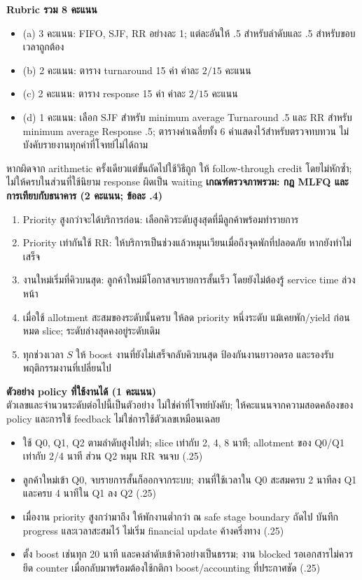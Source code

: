 \noindent\textbf{Rubric รวม 8 คะแนน}
\begin{itemize}[leftmargin=1.4em,itemsep=.12cm]
\item (a) 3 คะแนน: FIFO, SJF, RR อย่างละ 1; แต่ละอันให้ .5 สำหรับลำดับและ .5 สำหรับขอบเวลาถูกต้อง
\item (b) 2 คะแนน: ตาราง turnaround 15 ค่า ค่าละ $2/15$ คะแนน
\item (c) 2 คะแนน: ตาราง response 15 ค่า ค่าละ $2/15$ คะแนน
\item (d) 1 คะแนน: เลือก SJF สำหรับ minimum average Turnaround .5 และ RR สำหรับ minimum average Response .5; ตารางค่าเฉลี่ยทั้ง 6 ค่าแสดงไว้สำหรับตรวจทบทวน ไม่บังคับรายงานทุกค่าที่โจทย์ไม่ได้ถาม
\end{itemize}
\noindent หากผิดจาก arithmetic ครั้งเดียวแต่ขั้นถัดไปใช้วิธีถูก ให้ follow-through credit โดยไม่หักซ้ำ; ไม่ให้ครบในส่วนที่ใช้นิยาม response ผิดเป็น waiting
\newpage{}
\noindent\textbf{เกณฑ์ตรวจภาพรวม: กฎ MLFQ และการเทียบกับธนาคาร (2 คะแนน; ข้อละ .4)}
\begin{enumerate}[leftmargin=1.4em,itemsep=.18cm]
\item Priority สูงกว่าจะได้บริการก่อน: เลือกคิวระดับสูงสุดที่มีลูกค้าพร้อมทำรายการ
\item Priority เท่ากันใช้ RR: ให้บริการเป็นช่วงแล้วหมุนเวียนเมื่อถึงจุดพักที่ปลอดภัย หากยังทำไม่เสร็จ
\item งานใหม่เริ่มที่คิวบนสุด: ลูกค้าใหม่มีโอกาสจบรายการสั้นเร็ว โดยยังไม่ต้องรู้ service time ล่วงหน้า
\item เมื่อใช้ allotment สะสมของระดับนั้นครบ ให้ลด priority หนึ่งระดับ แม้เคยพัก/yield ก่อนหมด slice; ระดับล่างสุดคงอยู่ระดับเดิม
\item ทุกช่วงเวลา $S$ ให้ boost งานที่ยังไม่เสร็จกลับคิวบนสุด ป้องกันงานยาวอดรอ และรองรับพฤติกรรมงานที่เปลี่ยนไป
\end{enumerate}
\noindent\textbf{ตัวอย่าง policy ที่ใช้งานได้ (1 คะแนน)}\\
ตัวเลขและจำนวนระดับต่อไปนี้เป็นตัวอย่าง ไม่ใช่ค่าที่โจทย์บังคับ; ให้คะแนนจากความสอดคล้องของ policy และการใช้ feedback ไม่ใช่การใช้ตัวเลขเหมือนเฉลย
\begin{itemize}[leftmargin=1.4em,itemsep=.12cm]
\item ใช้ Q0, Q1, Q2 ตามลำดับสูงไปต่ำ; slice เท่ากับ 2, 4, 8 นาที; allotment ของ Q0/Q1 เท่ากับ 2/4 นาที ส่วน Q2 หมุน RR จนจบ (.25)
\item ลูกค้าใหม่เข้า Q0, จบรายการสั้นก็ออกจากระบบ; งานที่ใช้เวลาใน Q0 สะสมครบ 2 นาทีลง Q1 และครบ 4 นาทีใน Q1 ลง Q2 (.25)
\item เมื่องาน priority สูงกว่ามาถึง ให้พักงานต่ำกว่า ณ safe stage boundary ถัดไป บันทึก progress และเวลาสะสมไว้ ไม่เริ่ม financial update ค้างครึ่งทาง (.25)
\item ตั้ง boost เช่นทุก 20 นาที และคงลำดับเข้าคิวอย่างเป็นธรรม; งาน blocked รอเอกสารไม่ควรยึด counter เมื่อกลับมาพร้อมต้องใช้กติกา boost/accounting ที่ประกาศชัด (.25)
\end{itemize}
